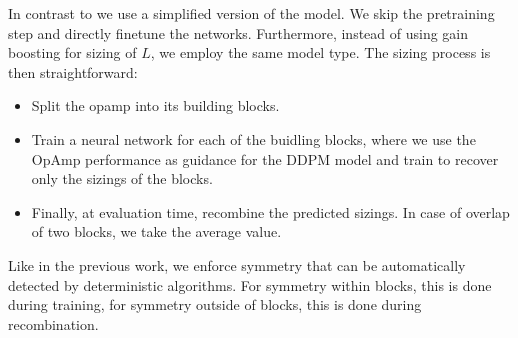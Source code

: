 \documentclass[conference]{IEEEtran}
\begin{document}
	In contrast to \cite{ leibl24inverse} we use a simplified version of the model. We skip the pretraining step and directly finetune the networks. Furthermore, instead of using gain boosting for sizing of $L$, we employ the same model type.
	The sizing process is then straightforward:
	\begin{itemize}
	\item Split the opamp into its building blocks.
	\item Train a neural network for each of the buidling blocks, where we use the OpAmp performance as guidance for the DDPM model and train to recover only the sizings of the blocks.
	\item Finally, at evaluation time, recombine the predicted sizings. In case of overlap of two blocks, we take the average value.
	\end{itemize}
	Like in the previous work, we enforce symmetry that can be automatically detected by deterministic algorithms. For symmetry within blocks, this is done during training, for symmetry outside of blocks, this is done during recombination.
			
		
\end{document}
